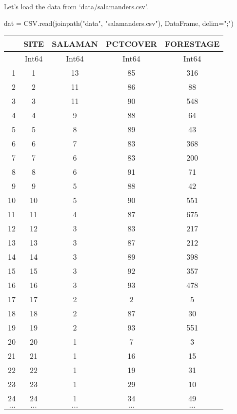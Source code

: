 \documentclass[
  letterpaper,
  DIV=11,
  numbers=noendperiod]{scrartcl}
\newenvironment{Shaded}{\begin{snugshade}}{\end{snugshade}}
\newcommand{\FunctionTok}[1]{\textcolor[rgb]{0.28,0.35,0.67}{#1}}
\newcommand{\NormalTok}[1]{\textcolor[rgb]{0.00,0.23,0.31}{#1}}
\newcommand{\OperatorTok}[1]{\textcolor[rgb]{0.37,0.37,0.37}{#1}}
\newcommand{\StringTok}[1]{\textcolor[rgb]{0.13,0.47,0.30}{#1}}
\begin{document}
Let's load the data from `data/salamanders.csv'.

\begin{Shaded}
\begin{Highlighting}[]
\NormalTok{dat }\OperatorTok{=}\NormalTok{ CSV.}\FunctionTok{read}\NormalTok{(}\FunctionTok{joinpath}\NormalTok{(}\StringTok{"data"}\NormalTok{, }\StringTok{"salamanders.csv"}\NormalTok{), DataFrame, delim}\OperatorTok{=}\StringTok{";"}\NormalTok{)}
\end{Highlighting}
\end{Shaded}

\begin{tabular}{r|cccc}
    & SITE & SALAMAN & PCTCOVER & FORESTAGE\\
    \hline
    & Int64 & Int64 & Int64 & Int64\\
    \hline
    1 & 1 & 13 & 85 & 316 \\
    2 & 2 & 11 & 86 & 88 \\
    3 & 3 & 11 & 90 & 548 \\
    4 & 4 & 9 & 88 & 64 \\
    5 & 5 & 8 & 89 & 43 \\
    6 & 6 & 7 & 83 & 368 \\
    7 & 7 & 6 & 83 & 200 \\
    8 & 8 & 6 & 91 & 71 \\
    9 & 9 & 5 & 88 & 42 \\
    10 & 10 & 5 & 90 & 551 \\
    11 & 11 & 4 & 87 & 675 \\
    12 & 12 & 3 & 83 & 217 \\
    13 & 13 & 3 & 87 & 212 \\
    14 & 14 & 3 & 89 & 398 \\
    15 & 15 & 3 & 92 & 357 \\
    16 & 16 & 3 & 93 & 478 \\
    17 & 17 & 2 & 2 & 5 \\
    18 & 18 & 2 & 87 & 30 \\
    19 & 19 & 2 & 93 & 551 \\
    20 & 20 & 1 & 7 & 3 \\
    21 & 21 & 1 & 16 & 15 \\
    22 & 22 & 1 & 19 & 31 \\
    23 & 23 & 1 & 29 & 10 \\
    24 & 24 & 1 & 34 & 49 \\
    $\dots$ & $\dots$ & $\dots$ & $\dots$ & $\dots$ \\
\end{tabular}
\end{document}
